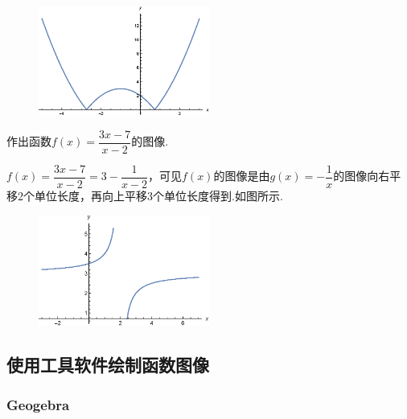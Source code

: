 \documentclass[lang=cn,math=cm,chinesefont=nofont,11pt,scheme=chinese,twocol]{elegantbook}
\begin{document}
\begin{figure}[h]
  \centering
  \includegraphics[width=0.5\textwidth]{image/2.1.5function3.eps}
  \label{img:2.1.5function3}
\end{figure}

\begin{example}
  作出函数$f(x)=\dfrac{3x-7}{x-2}$的图像.
\end{example}

\begin{spacing}{1.8}
  
\end{spacing}
\begin{solution}
  \begin{spacing}{1.8}
    $f(x)=\dfrac{3x-7}{x-2}=3-\dfrac{1}{x-2}$，可见$f(x)$的图像是由$g(x)=-\dfrac{1}{x}$的图像向右平移2个单位长度，再向上平移$3$个单位长度得到.如图所示.
  \end{spacing}
\end{solution}

\begin{figure}[h]
  \centering
  \includegraphics[width=0.5\textwidth]{image/2.1.5function4.eps}
  \label{img:2.1.5function4}
\end{figure}

\subsection{使用工具软件绘制函数图像}

\subsubsection{Geogebra}
\end{document}
